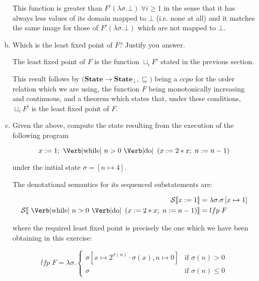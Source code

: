 \documentclass{article}
\begin{document}
\begin{enumerate}[(a)]
    This function is greater than $
      F^i(\lambda\sigma.\bot) \;\forall i \geq 1
    $ in the sense that it has always less values of its domain
    mapped to $\bot$ (i.e. none at all) and it matches 
    the same image for those of 
    $F^i(\lambda\sigma.\bot)$ which are not mapped to $\bot$.

  \item Which is the least fixed point of $F$? Justify 
    you answer.

    The least fixed point of $F$ is the function 
    $\sqcup_i F^i$ stated in the previous section.

    This result follows by $
    \big(
      \textbf{State} \rightarrow \textbf{State}_\bot,
      \sqsubseteq
    \big)$ being a $ccpo$ for the order relation which we 
    are using, the function $F$ being monotonically increasing and 
    continuous, and a theorem which states that, under these conditions, 
    $\sqcup_i F^i$ is the least fixed point of $F$. 

  \item Given the above, compute the state resulting from
    the execution of the following program

    $$
      x := 1;
      \text{ \Verb|while| } n > 0 \text{ \Verb|do| }
        \left( 
          x := 2 * x;\;
          n := n - 1
        \right)
    $$

    under the initial state $\sigma = [n \mapsto 4]$.

    The denotational semantics for its sequenced 
    substatements are:

    \begin{align*}
      \mathcal{S}\llbracket x:= 1\rrbracket &=
        \lambda\sigma.\sigma\left[x \mapsto 1\right] \\ 
      \mathcal{S}
      \llbracket
        \text{ \Verb|while| } n > 0 \text{ \Verb|do| }
        \left( 
          x := 2 * x;\;
          n := n - 1
        \right)
      \rrbracket &= lfp \; F
    \end{align*}
    
    where the required least fixed point is precisely
    the one which we have been obtaining in this exercise: 

    $$
      lfp \; F = \lambda\sigma. 
          \begin{cases}
          \sigma
          \left[
            x \mapsto 2^{\sigma(n)} \cdot \sigma(x),
            n \mapsto 0
          \right] & \text{if } \sigma(n) > 0 \\
          \sigma & \text{if } \sigma(n) \leq 0
          \end{cases}
    $$


\end{enumerate}
\end{document}
